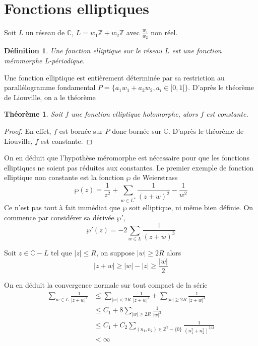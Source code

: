 \documentclass{article}
\newtheorem{definition}{Définition}
\newtheorem{theoreme}{Théorème}
\begin{document}
\section{Fonctions elliptiques}
\label{fctell}
Soit $L$ un réseau de $\mathbb{C}$, $L=w_{1}\mathbb{Z}+w_{2}\mathbb{Z}$ avec $\frac{w_{1}}{w_{2}}$ non réel.
\begin{definition}
Une fonction elliptique sur le réseau $L$ est une fonction méromorphe L-périodique.
\end{definition}

Une fonction elliptique est entièrement déterminée par sa restriction au parallélogramme fondamental
$P=\{a_{1}w_{1}+a_{2}w_{2}, a_{i}\in [0, 1[\}$. D'après le théorème de Liouville, on a le théorème
\begin{theoreme}
Soit $f$ une fonction elliptique holomorphe, alors $f$ est constante.
\end{theoreme}

\begin{proof}
En effet, $f$ est bornée sur $P$ donc bornée sur $\mathbb{C}$.
D'après le théorème de Liouville, $f$ est constante.
\end{proof}

On en déduit que l'hypothèse méromorphe est nécessaire pour que les fonctions elliptiques ne soient
pas réduites aux constantes. Le premier exemple de fonction elliptique non constante est
la fonction $\wp$ de Weierstrass
\begin{equation*}
\wp(z)=\frac{1}{z^2} + \sum_{w\in L^{*}}{\frac{1}{(z+w)^2}-\frac{1}{w^2}}
\end{equation*}
Ce n'est pas tout à fait immédiat que $\wp$ soit elliptique, ni même bien définie. On commence par
considérer sa dérivée $\wp'$,
\begin{equation*}
\wp'(z)=-2\sum_{w\in L}{\frac{1}{(z+w)^3}}
\end{equation*}

Soit $z\in \mathbb{C}-L$ tel que $|z| \leq R$, on suppose $|w|\geq 2R$ alors
\begin{equation*}
|z+w| \geq |w| - |z| \geq \frac{|w|}{2}
\end{equation*}

On en déduit la convergence normale sur tout compact de la série
\begin{align*}
\sum_{w\in L}{\frac{1}{|z+w|^3}} &\leq \sum_{|w| < 2R}{\frac{1}{|z+w|^3}} + \sum_{|w|\geq 2R}{\frac{1}{|z+w|^3}} \\
								&\leq C_{1} + 8\sum_{|w|\geq 2R}{\frac{1}{|w|^3}} \\
		&\leq C_{1} + C_{2}\sum_{(n_{1},n_{2})\in \mathbb{Z}^2-\{0\}}{\frac{1}{(n_{1}^2+n_{2}^2)^{3/2}}} \\
								&< \infty
\end{align*}
\end{document}
